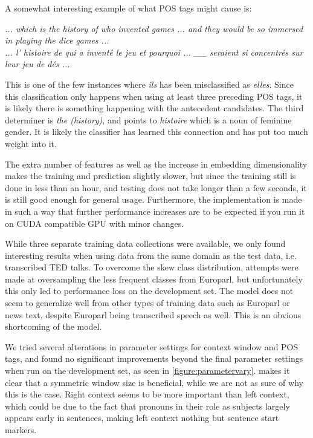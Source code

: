 \documentclass[11pt]{article}
\begin{document}
A somewhat interesting example of what POS tags might cause is:

\emph{... which is the history of who invented games ... and they would be so immersed in playing the dice games ...} \\
\emph{... l' histoire de qui a inventé le jeu et pourquoi ... \_\_ seraient si concentrés sur leur jeu de dés ...}

This is one of the few instances where \emph{ils} has been misclassified as \emph{elles}. Since this classification only happens when using at least three preceding POS tags, it is likely there is something happening with the antecedent candidates. The third determiner is \emph{the (history)}, and points to \emph{histoire} which is a noun of feminine gender. It is likely the classifier has learned this connection and has put too much weight into it.

The extra number of features as well as the increase in embedding dimensionality makes the training and prediction slightly slower, but since the training still is done in less than an hour, and testing does not take longer than a few seconds, it is still good enough for general usage.
Furthermore, the implementation is made in such a way that further performance increases are to be expected if you run it on CUDA compatible GPU with minor changes.

While three separate training data collections were available, we only found interesting results when using data from the same domain as the test data, i.e. transcribed TED talks.
To overcome the skew class distribution, attempts were made at oversampling the less frequent classes from Europarl, but unfortunately this only led to performance loss on the development set.
The model does not seem to generalize well from other types of training data such as Europarl or news text, despite Europarl being transcribed speech as well.
This is an obvious shortcoming of the model.

We tried several alterations in parameter settings for context window and POS tags, and found no significant improvements beyond the final parameter settings when run on the development set, as seen in \cref{figure:parametervary}.
 makes it clear that a symmetric window size is beneficial, while we are not as sure of why this is the case.
Right context seems to be more important than left context, which could be due to the fact that pronouns in their role as subjects largely appears early in sentences, making left context nothing but sentence start markers.
\end{document}
